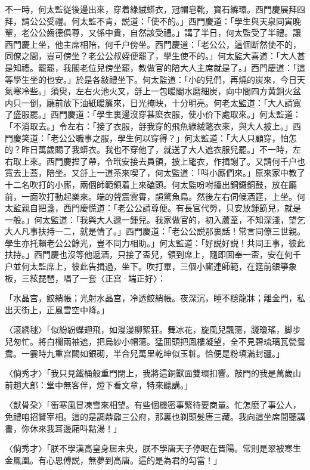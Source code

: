 不一時，何太監従後邊出來，穿着綠絨蟒衣，冠帽皂靴，寳石縧環。西門慶展拜四拜，請公公受禮。何太監不肯，説道：「使不的。」西門慶道：「學生與天泉同寅晚輩，老公公齒德俱尊，又係中貴，自然該受禮。」講了半日，何太監受了半禮。讓西門慶上坐，他主席相陪，何千户傍坐。西門慶道：「老公公，這個断然使不的，同僚之間，豈可傍坐？老公公叔姪便罷了，學生使不的。」何太監大喜道：「大人甚是知禮。罷罷，我閣老位兒傍坐罷，教做官的陪大人主席就是了。」西門慶道：「這等學生坐的也安。」於是各敍禮坐下。何太監道：「小的兒們，再燒的炭來，今日天氣寒冷些。」須臾，左右火池火叉，㧱上一包暖閣水磨細炭，向中間四方黄銅火盆内只一倒，廳前放下油紙暖簾來，日光掩映，十分明亮。何老太監道：「大人請寬了盛服罷。」西門慶道：「學生裏邊沒穿甚麽衣服，使小价下處取來。」何太監道：「不消取去。」令左右：「接了衣服，㧱我穿的飛魚綠絨氅衣來，與大人披上。」西門慶笑道：「老公公職事之服，學生何以穿得？」何太監道：「大人只顧穿，怕怎的？昨日萬歲賜了我蟒衣。我也不穿他了，就送了大人遮衣服兒罷。」不一時，左右取上來。西門慶揑了帶，令玳安接去員領，披上氅衣，作揖謝了。又請何千户也寬去上蓋，陪坐。又㧱上一道茶來喫了，何太監道：「呌小廝們來。」原來家中教了十二名吹打的小廝，兩個師範領着上來磕頭。何太監吩咐擡出銅鑼銅鼓，放在廳前，一面吹打動起樂來。端的聲震雲霄，韻驚魚鳥。然後左右伺候酒筵，上坐。何太監親自把盞，西門慶慌道：「老公公請尊便。有長官代勞，只安放鍾筯兒，就是一般。」何太監道：「我與大人遞一鍾兒。我家做官的，初入蘆葦，不知深淺，望乞大人凡事扶持一二，就是情了。」西門慶道：「老公公説那裏話！常言同僚三世親。學生亦托賴老公公餘光，豈不同力相助。」何太監道：「好説好説！共同王事，彼此扶持。」西門慶也沒等他遞酒，只接了盃兒，領到席上，隨即囬奉一盃，安在何千户並何太監席上，彼此告揖過，坐下。吹打畢，三個小廝連師範，在筵前銀箏象板，三絃琵琶，唱了一套〈正宫·端正好〉：

「水晶宫，鮫綃帳；光射水晶宫，冷透鮫綃帳。夜深沉，睡不穩龍牀；離金門，私出天街上，正風雪空中降。」　

〈滚綉毬〉「似紛紛蝶翅飛，如漫漫柳絮狂。舞冰花，旋風兒飄蕩，踐瓊瑤，脚步兒匆忙。將白欄兩袖遮，把烏紗小帽蕩。猛囬頭把鳳樓凝望，全不見碧琉璃瓦甇鴛鴦。一霎時九重宫闕如銀砌，半合兒萬里乾坤似玉粧。恰便是粉填滿封疆。」

〈倘秀才〉「我只見鐵桶般重門閉上，我將這銅獸面雙環扣響。敲門的我是萬歲山前趙大郎：堂中無客伴，燈下看文章，特來聽講。」

〈獃骨朶〉「衝寒風冒凍雪來相望。有些個機密事緊待要商量。忙怎麽了事公人，免禮咱招賢宰相。這的是調鼎鼐三公府，那裏也剃頭髮唐三藏。我向這坐席間聽講書，你休來我耳邊廂呌點湯！」

〈倘秀才〉「朕不學漢高皇身居未央，朕不學唐天子停眠在晋陽。常則是翠被寒生金鳳凰。有心思傅説，無夢到高唐。這的是為君的勾當！」

